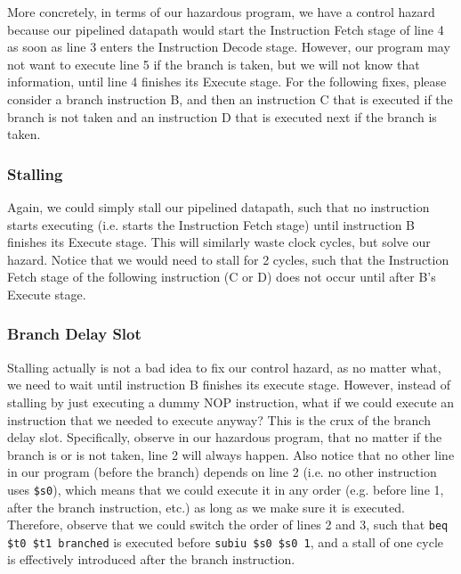 \documentclass{article}
\begin{document}
More concretely, in terms of our hazardous program, we have a control hazard because our pipelined datapath would start the Instruction Fetch stage of line 4 as soon as line 3 enters the Instruction Decode stage. However, our program may not want to execute line 5 if the branch is taken, but we will not know that information, until line 4 finishes its Execute stage. For the following fixes, please consider a branch instruction B, and then an instruction C that is executed if the branch is not taken and an instruction D that is executed next if the branch is taken.

\subsubsection{Stalling}
Again, we could simply stall our pipelined datapath, such that no instruction starts executing (i.e. starts the Instruction Fetch stage) until instruction B finishes its Execute stage. This will similarly waste clock cycles, but solve our hazard. Notice that we would need to stall for 2 cycles, such that the Instruction Fetch stage of the following instruction (C or D) does not occur until after B's Execute stage.%

\subsubsection{Branch Delay Slot}
Stalling actually is not a bad idea to fix our control hazard, as no matter what, we need to wait until instruction B finishes its execute stage. However, instead of stalling by just executing a dummy NOP instruction, what if we could execute an instruction that we needed to execute anyway? This is the crux of the branch delay slot. Specifically, observe in our hazardous program, that no matter if the branch is or is not taken, line 2 will always happen. Also notice that no other line in our program (before the branch) depends on line 2 (i.e. no other instruction uses \texttt{\$s0}), which means that we could execute it in any order (e.g. before line 1, after the branch instruction, etc.) as long as we make sure it is executed. Therefore, observe that we could switch the order of lines 2 and 3, such that \texttt{beq \$t0 \$t1 branched} is executed before \texttt{subiu \$s0 \$s0 1}, and a stall of one cycle is effectively introduced after the branch instruction. 
\end{document}

